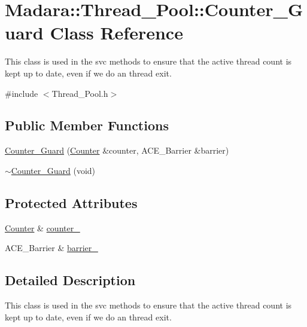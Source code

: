 \hypertarget{classMadara_1_1Thread__Pool_1_1Counter__Guard}{
\section{Madara::Thread\_\-Pool::Counter\_\-Guard Class Reference}
\label{dc/d20/classMadara_1_1Thread__Pool_1_1Counter__Guard}
}


This class is used in the svc methods to ensure that the active thread count is kept up to date, even if we do an thread exit.  




{\ttfamily \#include $<$Thread\_\-Pool.h$>$}

\subsection*{Public Member Functions}
\begin{DoxyCompactItemize}
\item 
\hyperlink{classMadara_1_1Thread__Pool_1_1Counter__Guard_a3d01ec30558231bff8d699587f8d2a15}{Counter\_\-Guard} (\hyperlink{classMadara_1_1Thread__Pool_a301b0deb023c42a89927746f3453218f}{Counter} \&counter, ACE\_\-Barrier \&barrier)
\item 
\hyperlink{classMadara_1_1Thread__Pool_1_1Counter__Guard_a08fa9c22d83699c4009ed80f62565cab}{$\sim$Counter\_\-Guard} (void)
\end{DoxyCompactItemize}
\subsection*{Protected Attributes}
\begin{DoxyCompactItemize}
\item 
\hyperlink{classMadara_1_1Thread__Pool_a301b0deb023c42a89927746f3453218f}{Counter} \& \hyperlink{classMadara_1_1Thread__Pool_1_1Counter__Guard_a62d02cc4a119ee9aa1e8ee0b496a3ea8}{counter\_\-}
\item 
ACE\_\-Barrier \& \hyperlink{classMadara_1_1Thread__Pool_1_1Counter__Guard_a41a3e780e179e52dbf56ba9b01a3b21b}{barrier\_\-}
\end{DoxyCompactItemize}


\subsection{Detailed Description}
This class is used in the svc methods to ensure that the active thread count is kept up to date, even if we do an thread exit. 

